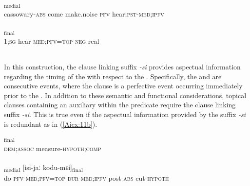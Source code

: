 \documentclass[output=paper]{LSP/langsci}
\begin{document}
\begin{exe}
\ex \label{Aiex:10ab}
\begin{xlist}
\ex \label{Aiex:10a}
\textsubscript{medial}\\
cassowary-\textsc{abs}	come	make.noise	\textsc{pfv}	hear;\textsc{pst}-\textsc{med};\textsc{ipfv}\\
\glt {}\\
\ex \label{Aiex:10b}
\textsubscript{final}\\
\textsc{1;sg}	hear-\textsc{med};\textsc{pfv}=\textsc{top}	\textsc{neg}	real\\
\glt {}\\
\end{xlist}
\end{exe}

In this construction, the clause linking suffix \textit{-si} provides aspectual information regarding the timing of the  with respect to the . Specifically, the  and  are consecutive events, where the  clause is a perfective event occurring immediately prior to the .
	In addition to these semantic and functional considerations, topical clauses containing an auxiliary within the predicate require the clause linking suffix  \textit{-si}. This is true even if the aspectual information provided by the suffix  \textit{-si} is redundant as in (\ref{Aiex:11b}).

\begin{exe}
\ex \label{Aiex:11ab}
\begin{xlist}
\ex \label{Aiex:11a}
\textsubscript{final}\\
\textsc{dem};\textsc{assoc}	measure-\textsc{hypoth};\textsc{comp}\\
\glt {}\\
\ex \label{Aiex:11b}
\textsubscript{medial}	[isi-jaː	kodu-mɛi]\textsubscript{final}\\
do	\textsc{pfv}-\textsc{med};\textsc{pfv}=\textsc{top}	\textsc{dur}-\textsc{med};\textsc{ipfv}	post-\textsc{abs}	cut-\textsc{hypoth}\\
\glt {}\\
\end{xlist}
\end{exe}
\end{document}

